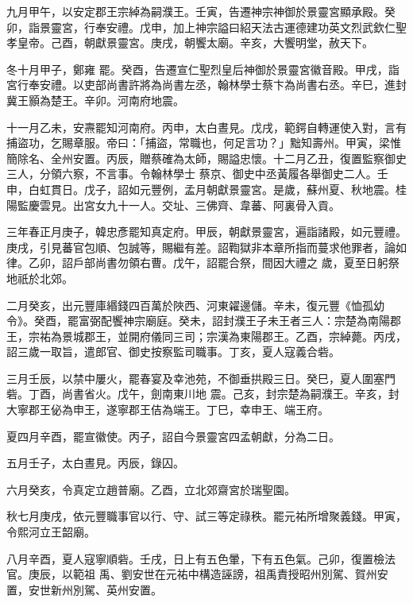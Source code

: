 \begin{pinyinscope}
 九月甲午，以安定郡王宗綽為嗣濮王。壬寅，告遷神宗神御於景靈宮顯承殿。癸卯，詣景靈宮，行奉安禮。戊申，加上神宗謚曰紹天法古運德建功英文烈武欽仁聖孝皇帝。己酉，朝獻景靈宮。庚戌，朝饗太廟。辛亥，大饗明堂，赦天下。



 冬十月甲子，鄭雍
 罷。癸酉，告遷宣仁聖烈皇后神御於景靈宮徽音殿。甲戌，詣宮行奉安禮。以吏部尚書許將為尚書左丞，翰林學士蔡卞為尚書右丞。辛巳，進封冀王顥為楚王。辛卯。河南府地震。



 十一月乙未，安燾罷知河南府。丙申，太白晝見。戊戌，範鍔自轉運使入對，言有捕盜功，乞賜章服。帝曰：「捕盜，常職也，何足言功？」黜知壽州。甲寅，梁惟簡除名、全州安置。丙辰，贈蔡確為太師，賜謚忠懷。十二月乙丑，復置監察御史三人，分領六察，不言事。令翰林學士
 蔡京、御史中丞黃履各舉御史二人。壬申，白虹貫日。戊子，詔如元豐例，孟月朝獻景靈宮。是歲，蘇州夏、秋地震。桂陽監慶雲見。出宮女九十一人。交址、三佛齊、韋蕃、阿裏骨入貢。



 三年春正月庚子，韓忠彥罷知真定府。甲辰，朝獻景靈宮，遍詣諸殿，如元豐禮。庚戌，引見蕃官包順、包誠等，賜繼有差。詔鞫獄非本章所指而蔓求他罪者，論如律。乙卯，詔戶部尚書勿領右曹。戊午，詔罷合祭，間因大禮之
 歲，夏至日躬祭地祇於北郊。



 二月癸亥，出元豐庫緡錢四百萬於陜西、河東糴邊儲。辛未，復元豐《恤孤幼令》。癸酉，罷富弼配饗神宗廟庭。癸未，詔封濮王子未王者三人：宗楚為南陽郡王，宗祐為景城郡王，並開府儀同三司；宗漢為東陽郡王。乙酉，宗綽薨。丙戌，詔三歲一取旨，遣郎官、御史按察監司職事。丁亥，夏人寇義合砦。



 三月壬辰，以禁中屢火，罷春宴及幸池苑，不御垂拱殿三日。癸巳，夏人圍塞門砦。丁酉，尚書省火。戊午，劍南東川地
 震。己亥，封宗楚為嗣濮王。辛亥，封大寧郡王佖為申王，遂寧郡王佶為端王。丁巳，幸申王、端王府。



 夏四月辛酉，罷宣徽使。丙子，詔自今景靈宮四孟朝獻，分為二日。



 五月壬子，太白晝見。丙辰，錄囚。



 六月癸亥，令真定立趙普廟。乙酉，立北郊齋宮於瑞聖園。



 秋七月庚戌，依元豐職事官以行、守、試三等定祿秩。罷元祐所增聚義錢。甲寅，令熙河立王韶廟。



 八月辛酉，夏人寇寧順砦。壬戌，日上有五色暈，下有五色氣。己卯，復置檢法官。庚辰，以範祖
 禹、劉安世在元祐中構造誣謗，祖禹責授昭州別駕、賀州安置，安世新州別駕、英州安置。




\end{pinyinscope}
